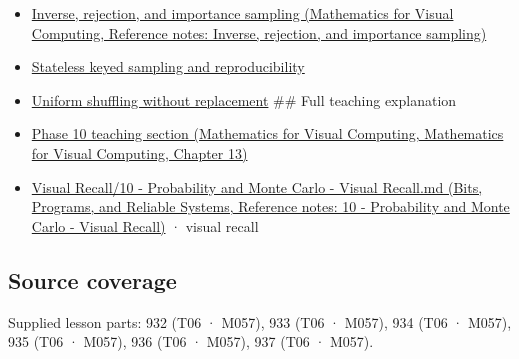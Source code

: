 \begin{itemize}
\item
  \href{../02-Mathematics-for-Visual-Computing/main.pdf\#nameddest=appendix-8d863ed954d0}{Inverse, rejection, and importance sampling (Mathematics for Visual Computing, Reference notes: Inverse, rejection, and importance sampling)}
\item
  \hyperref[appendix-daaf25bfd3a0]{Stateless keyed sampling and reproducibility}
\item
  \hyperref[appendix-184fcc411663]{Uniform shuffling without replacement} \#\# Full teaching explanation
\item
  \href{../02-Mathematics-for-Visual-Computing/main.pdf\#nameddest=02-foundations-ii-ch029-a-computer-produces-deterministic-pseudorandom-sequences}{Phase 10 teaching section (Mathematics for Visual Computing, Mathematics for Visual Computing, Chapter 13)}
\item
  \href{../01-Bits-Programs-and-Reliable-Systems/main.pdf\#nameddest=appendix-cb5af353ef77}{Visual Recall/10 - Probability and Monte Carlo - Visual Recall.md (Bits, Programs, and Reliable Systems, Reference notes: 10 - Probability and Monte Carlo - Visual Recall)} · visual recall
\end{itemize}

\subsection{Source coverage}\label{appendix-e0f7c7e08f3a-source-coverage}

Supplied lesson parts: 932 (T06 · M057), 933 (T06 · M057), 934 (T06 · M057), 935 (T06 · M057), 936 (T06 · M057), 937 (T06 · M057).
